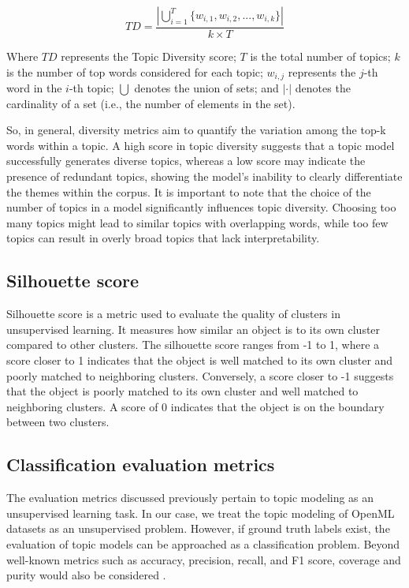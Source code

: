 \[TD = \frac{|\bigcup_{i=1}^{T} \{ w_{i,1}, w_{i,2}, ..., w_{i,k} \}|}{k \times T}\]

Where $TD$ represents the Topic Diversity score; $T$ is the total number of topics; $k$ is the number of top words considered for each topic; $w_{i,j}$ represents the $j$-th word in the $i$-th topic; $\bigcup$ denotes the union of sets; and $|\cdot|$ denotes the cardinality of a set (i.e., the number of elements in the set).

So, in general, diversity metrics aim to quantify the variation among the top-k words within a topic. A high score in topic diversity suggests that a topic model successfully generates diverse topics, whereas a low score may indicate the presence of redundant topics, showing the model's inability to clearly differentiate the themes within the corpus. It is important to note that the choice of the number of topics in a model significantly influences topic diversity. Choosing too many topics might lead to similar topics with overlapping words, while too few topics can result in overly broad topics that lack interpretability.

\subsection{Silhouette score}
\label{sec:silhouette_score}
Silhouette score \cite{shahapure_cluster_2020} is a metric used to evaluate the quality of clusters in unsupervised learning. It measures how similar an object is to its own cluster compared to other clusters. The silhouette score ranges from -1 to 1, where a score closer to 1 indicates that the object is well matched to its own cluster and poorly matched to neighboring clusters. Conversely, a score closer to -1 suggests that the object is poorly matched to its own cluster and well matched to neighboring clusters. A score of 0 indicates that the object is on the boundary between two clusters.

\subsection{Classification evaluation metrics}

The evaluation metrics discussed previously pertain to topic modeling as an unsupervised learning task. In our case, we treat the topic modeling of OpenML datasets as an unsupervised problem. However, if ground truth labels exist, the evaluation of topic models can be approached as a classification problem. Beyond well-known metrics such as accuracy, precision, recall, and F1 score, coverage and purity would also be considered \cite{churchill_evolution_2022}.

